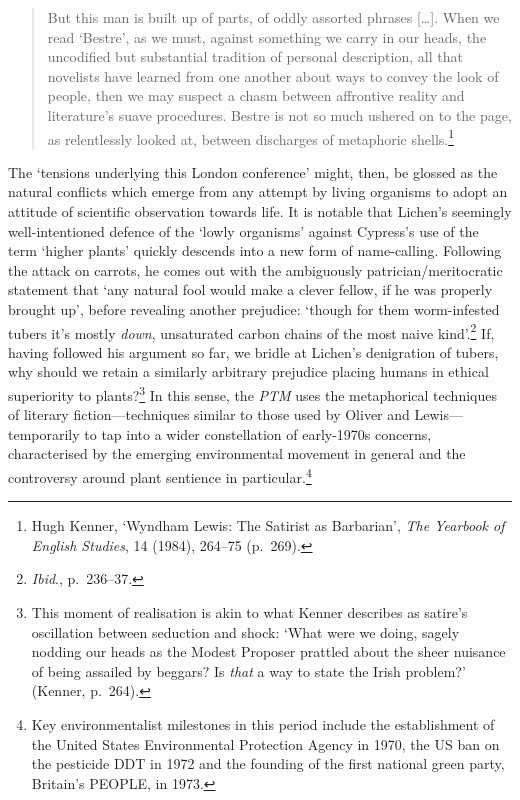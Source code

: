\documentclass[]{article}
\begin{document}
\begin{quote}
\singlespacing But this man is built up of parts, of oddly assorted
phrases {[}\ldots{}{]}. When we read ‘Bestre’, as we must, against
something we carry in our heads, the uncodified but substantial
tradition of personal description, all that novelists have learned from
one another about ways to convey the look of people, then we may suspect
a chasm between affrontive reality and literature’s suave procedures.
Bestre is not so much ushered on to the page, as relentlessly looked at,
between discharges of metaphoric shells.\footnote{Hugh Kenner, ‘Wyndham
  Lewis: The Satirist as Barbarian’, \emph{The Yearbook of English
  Studies}, 14 (1984), 264–75 (p.~269).}
\end{quote}

\noindent The ‘tensions underlying this London conference’ might, then,
be glossed as the natural conflicts which emerge from any attempt by
living organisms to adopt an attitude of scientific observation towards
life. It is notable that Lichen’s seemingly well-intentioned defence of
the ‘lowly organisms’ against Cypress’s use of the term ‘higher plants’
quickly descends into a new form of name-calling. Following the attack
on carrots, he comes out with the ambiguously patrician/meritocratic
statement that ‘any natural fool would make a clever fellow, if he was
properly brought up’, before revealing another prejudice: ‘though for
them worm-infested tubers it’s mostly \emph{down}, unsaturated carbon
chains of the most naive kind’.\footnote{\emph{Ibid}., p.~236–37.} If,
having followed his argument so far, we bridle at Lichen’s denigration
of tubers, why should we retain a similarly arbitrary prejudice placing
humans in ethical superiority to plants?\footnote{This moment of
  realisation is akin to what Kenner describes as satire’s oscillation
  between seduction and shock: ‘What were we doing, sagely nodding our
  heads as the Modest Proposer prattled about the sheer nuisance of
  being assailed by beggars? Is \emph{that} a way to state the Irish
  problem?’ (Kenner, p.~264).} In this sense, the \emph{PTM} uses the
metaphorical techniques of literary fiction—techniques similar to those
used by Oliver and Lewis—temporarily to tap into a wider constellation
of early-1970s concerns, characterised by the emerging environmental
movement in general and the controversy around plant sentience in
particular.\footnote{Key environmentalist milestones in this period
  include the establishment of the United States Environmental
  Protection Agency in 1970, the US ban on the pesticide DDT in 1972 and
  the founding of the first national green party, Britain’s PEOPLE, in
  1973.}
\end{document}
